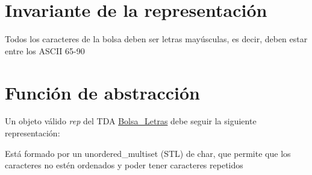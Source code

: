 \hypertarget{repBolsa_Letras_invBolsa_Letras}{}\section{Invariante de la representación}\label{repBolsa_Letras_invBolsa_Letras}

\begin{DoxyItemize}
\item Todos los caracteres de la bolsa deben ser letras mayúsculas, es decir, deben estar entre los A\+S\+C\+II 65-\/90 
\end{DoxyItemize}\hypertarget{repBolsa_Letras_faBolsa_Letras}{}\section{Función de abstracción}\label{repBolsa_Letras_faBolsa_Letras}
Un objeto válido {\itshape rep} del T\+DA \hyperlink{classBolsa__Letras}{Bolsa\+\_\+\+Letras} debe seguir la siguiente representación\+:
\begin{DoxyItemize}
\item Está formado por un unordered\+\_\+multiset (S\+TL) de char, que permite que los caracteres no estén ordenados y poder tener caracteres repetidos 
\end{DoxyItemize}